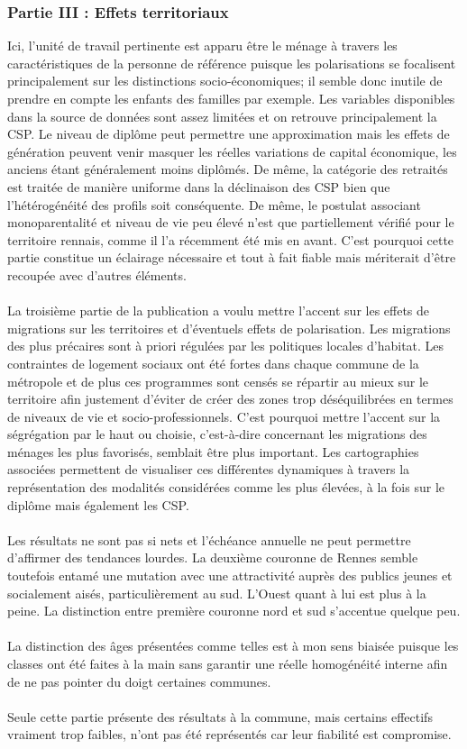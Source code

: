 \documentclass{bredele}
\begin{document}
\subsubsection{Partie III : Effets territoriaux}
Ici, l'unité de travail pertinente est apparu être le ménage à travers les caractéristiques de la personne de référence puisque les polarisations se focalisent principalement sur les distinctions socio-économiques; il semble donc inutile de prendre en compte les enfants des familles par exemple. Les variables disponibles dans la source de données sont assez limitées et on retrouve principalement la CSP. Le niveau de diplôme peut permettre une approximation mais les effets de génération peuvent venir masquer les réelles variations de capital économique, les anciens étant généralement moins diplômés. De même, la catégorie des retraités est traitée de manière uniforme dans la déclinaison des CSP bien que l'hétérogénéité des profils soit conséquente. De même, le postulat associant monoparentalité et niveau de vie peu élevé n'est que partiellement vérifié pour le territoire rennais, comme il l'a récemment été mis en avant. C'est pourquoi cette partie constitue un éclairage nécessaire et tout à fait fiable mais mériterait d'être recoupée avec d'autres éléments.
\\\\La troisième partie de la publication a voulu mettre l’accent sur les effets de migrations sur les territoires et d’éventuels effets de polarisation. Les migrations des plus précaires sont à priori régulées par les politiques locales d’habitat. Les contraintes de logement sociaux ont été fortes dans chaque commune de la métropole et de plus ces programmes sont censés se répartir au mieux sur le territoire afin justement d’éviter de créer des zones trop déséquilibrées en termes de niveaux de vie et socio-professionnels. C’est pourquoi mettre l’accent sur la ségrégation par le haut ou choisie, c'est-à-dire concernant les migrations des ménages les plus favorisés, semblait être plus important. Les cartographies associées permettent de visualiser ces différentes dynamiques à travers la représentation des modalités considérées comme les plus élevées, à la fois sur le diplôme mais également les CSP.
\\\\
Les résultats ne sont pas si nets et l'échéance annuelle ne peut permettre d'affirmer des tendances lourdes. La deuxième couronne de Rennes semble toutefois entamé une mutation avec une attractivité auprès des publics jeunes et socialement aisés, particulièrement au sud. L'Ouest quant à lui est plus à la peine. La distinction entre première couronne nord et sud s'accentue quelque peu.
\\\\La distinction des âges présentées comme telles est à mon sens biaisée puisque les classes ont été faites à la main sans garantir une réelle homogénéité interne afin de ne pas pointer du doigt certaines communes.
\\\\Seule cette partie présente des résultats à la commune, mais certains effectifs vraiment trop faibles, n'ont pas été représentés car leur fiabilité est compromise.
\end{document}
